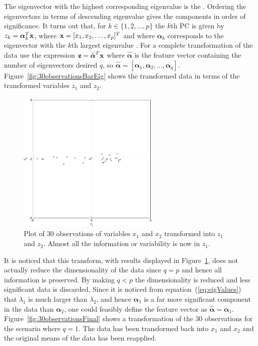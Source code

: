 The eigenvector with the highest corresponding eigenvalue is the \DIFdelbegin {}\DIFdelend \DIFaddbegin {}\DIFaddend . Ordering the eigenvectors in terms of descending eigenvalue gives the components in order of significance. It turns out that, for $k \in \{1, 2, \ldots, p\}$ the $k$th PC is given by $z_k = \boldsymbol\alpha_k^T\textrm{\textbf{x}}$, where $\textrm{\textbf{x}} = [x_1,x_2,\ldots, x_p]^T$ and where $\boldsymbol\alpha_k$ corresponds to the eigenvector with the $k$th largest eigenvalue \citep[p. 2-3]{Jolliffe1986}. For a complete transformation of the data use the expression $\textrm{\textbf{z}} = \hat{\boldsymbol\alpha}^T\textrm{\textbf{x}}$ where $\hat{\boldsymbol\alpha}$ is the feature vector containing the number of eigenvectors desired $q$, so $\hat{\boldsymbol\alpha} = [\boldsymbol\alpha_1,\boldsymbol\alpha_2,\ldots,\boldsymbol\alpha_q]$. Figure~\ref{fig:30observationsBarEig} shows the transformed data in terms of the transformed variables $z_1$ and $z_2$.

\begin{figure}[!]
  \begin{center}
    \includegraphics[width=260px]{30observationsBarTrans.pdf}
    \caption{Plot of 30 observations of variables $x_1$ and $x_2$ transformed into $z_1$ and $z_2$. Almost all the information or variability is now in $z_1$.}\label{fig:30observationsBarTrans}
  \end{center}
\end{figure}

It is noticed that this transform, with results displayed in Figure~\ref{fig:30observationsBarTrans}, does not actually reduce the dimensionality of the data since $q=p$ and hence all information is preserved. By making $q<p$ the dimensionality is reduced and less significant data is discarded. Since it is noticed from equation~(\ref{eq:eigValues}) that $\lambda_1$ is much larger than $\lambda_2$, and hence $\boldsymbol\alpha_1$ is a far more significant component in the data than $\boldsymbol\alpha_2$, one could feasibly define the feature vector as $\hat{\boldsymbol\alpha} = \boldsymbol\alpha_1$. Figure~\ref{fig:30observationsFinal} shows a transformation of the 30 observations for the scenario where $q=1$. The data has been transformed back into $x_1$ and $x_2$ and the original means of the data has been reapplied.

